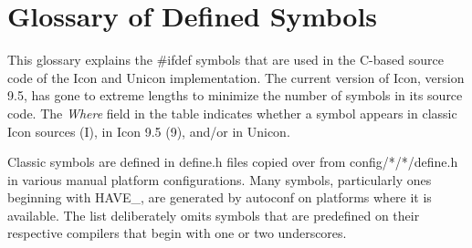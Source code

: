 \chapter{Glossary of Defined Symbols}

This glossary explains the \#ifdef symbols that are used in the
C-based source code of the Icon and Unicon implementation.  The
current version of Icon, version 9.5, has gone to extreme lengths
to minimize the number of symbols in its source code. The {\em Where\/}
field in the table indicates whether a symbol appears in classic Icon
sources (I), in Icon 9.5 (9), and/or in Unicon.

Classic symbols are defined in define.h files copied over from
config/*/*/define.h in various manual platform configurations.
Many symbols, particularly ones beginning with HAVE\_, are
generated by autoconf on platforms where it is available.
The list deliberately omits symbols that are predefined on their
respective compilers that begin with one or two underscores.


\bigskip


